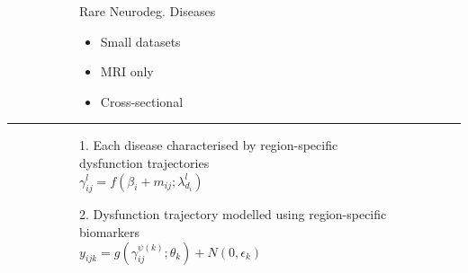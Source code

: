 \documentclass[portrait,a0,final,20pt]{a0poster}
\newcommand{\fnt}[1]{\LARGE{#1}}
\begin{document}
{\begin{multicols}{2}
\begin{figure}[H]
{\begin{subfigure}{0.48\columnwidth}
\begin{itemize}
  \end{itemize}
\end{subfigure}
\begin{subfigure}{0.48\columnwidth}
 
   Rare Neurodeg. Diseases
  
  \begin{itemize}
   \item Small datasets \no
   \item MRI only \no
   \item Cross-sectional \no
  \end{itemize}
 
\end{subfigure}
 }
\end{figure}

\end{multicols}
\hrule

\begin{multicols}{2}							
\raggedcolumns	

 
\vspace{0.6em}
\begin{figure}[H]
 \centering
   \begin{subfigure}{0.49\columnwidth}
   \centering
   \fnt{1. Each disease characterised by region-specific dysfunction trajectories}\\
   $ \gamma_{ij}^l = f(\beta_{i} + m_{ij}; \lambda_{d_i}^l) $\\
   
  \end{subfigure}
  \begin{subfigure}{0.49\columnwidth}
   \centering
   \fnt{2. Dysfunction trajectory modelled using region-specific biomarkers}\\
   $ y_{ijk} = g( \gamma_{ij}^{\psi(k)} ; \theta_k) + N(0,\epsilon_k) $
  \end{subfigure}


\end{figure}
\end{multicols}}
\end{document}
